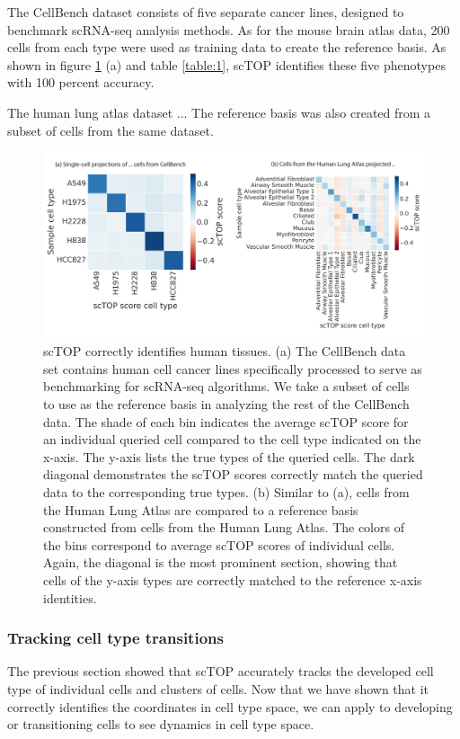 \documentclass[aps,superscriptaddress, notitlepage,longbibliography]{revtex4-1}
\begin{document}
The CellBench dataset  consists of five separate cancer lines, designed to benchmark scRNA-seq analysis methods. As for the mouse brain atlas data, 200 cells from each type were used as training data to create the reference basis. As shown in figure \ref{FIG:3} (a) and table \ref{table:1}, scTOP identifies these five phenotypes with 100 percent accuracy.

The human lung atlas dataset ...  The reference basis was also created from a subset of cells from the same dataset. 

\begin{figure}
	\centering
		\includegraphics[scale=0.8]{figs/fig3.pdf}
	\caption{scTOP correctly identifies human tissues. (a) The CellBench data set contains human cell cancer lines specifically processed to serve as benchmarking for scRNA-seq algorithms. We take a subset of cells to use as the reference basis in analyzing the rest of the CellBench data. The shade of each bin indicates the average scTOP score for an individual queried cell compared to the cell type indicated on the x-axis. The y-axis lists the true types of the queried cells. The dark diagonal demonstrates the scTOP scores correctly match the queried data to the corresponding true types. (b) Similar to (a), cells from the Human Lung Atlas are compared to a reference basis constructed from cells from the Human Lung Atlas. The colors of the bins correspond to average scTOP scores of individual cells. Again, the diagonal is the most prominent section, showing that cells of the y-axis types are correctly matched to the reference x-axis identities.}
	\label{FIG:3}
\end{figure}


\subsubsection{Tracking cell type transitions}
The previous section showed that scTOP accurately tracks the developed cell type of individual cells and clusters of cells. Now that we have shown that it correctly identifies the coordinates in cell type space, we can apply to developing or transitioning cells to see dynamics in cell type space.
\end{document}

